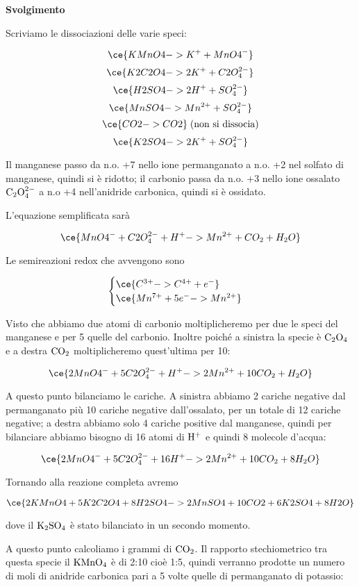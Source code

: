 \vspace{0.2cm}\large\textbf{Svolgimento}\normalsize

\vspace{0.2cm}Scriviamo le dissociazioni delle varie speci:

$$\ce{KMnO4 -> K^+ + MnO4^-}$$
$$\ce{K2C2O4 -> 2K^+ + C2O_4^{2-}}$$
$$\ce{H2SO4 -> 2H^+ + SO_4^{2-}}$$
$$\ce{MnSO4 -> Mn^{2+} + SO_4^{2-}}$$
$$\ce{CO2 -> CO2}\;\text{(non si dissocia)}$$
$$\ce{K2SO4 -> 2K^+ + SO_4^{2-}}$$

Il manganese passo da n.o. +7 nello ione permanganato a n.o. +2 nel solfato di manganese, quindi si è ridotto; il carbonio passa da n.o. +3 nello ione ossalato $\rm C_2O_4^{2-}$ a n.o +4 nell'anidride carbonica, quindi si è ossidato.

L'equazione semplificata sarà

$$\ce{MnO4^- + C2O_4^{2-} + H^+ -> Mn^{2+} + CO_2 + H_2O}$$

Le semireazioni redox che avvengono sono

$$\begin{cases}
    \ce{C^{3+} -> C^{4+} + e^-}\\
    \ce{Mn^{7+} + 5e^- -> Mn^{2+}}
\end{cases}$$

Visto che abbiamo due atomi di carbonio moltiplicheremo per due le speci del manganese e per 5 quelle del carbonio. Inoltre poiché a sinistra la specie è $\rm C_2O_4$ e a destra $\rm CO_2$ moltiplicheremo quest'ultima per 10:

$$\ce{2MnO4^- + 5C2O_4^{2-} + H^+ -> 2Mn^{2+} + 10CO_2 + H_2O}$$

A questo punto bilanciamo le cariche. A sinistra abbiamo 2 cariche negative dal permanganato più 10 cariche negative dall'ossalato, per un totale di 12 cariche negative; a destra abbiamo solo 4 cariche positive dal manganese, quindi per bilanciare abbiamo bisogno di 16 atomi di $\rm H^+$ e quindi 8 molecole d'acqua:

$$\ce{2MnO4^- + 5C2O_4^{2-} + 16H^+ -> 2Mn^{2+} + 10CO_2 + 8H_2O}$$

Tornando alla reazione completa avremo

$$\ce{2KMnO4 + 5K2C2O4 + 8H2SO4 -> 2MnSO4 + 10CO2 + 6K2SO4 + 8H2O}$$

dove il $\rm K_2SO_4$ è stato bilanciato in un secondo momento.

A questo punto calcoliamo i grammi di $\rm CO_2$. Il rapporto stechiometrico tra questa specie il $\rm KMnO_4$ è di 2:10 cioè 1:5, quindi verranno prodotte un numero di moli di anidride carbonica pari a 5 volte quelle di permanganato di potassio:

